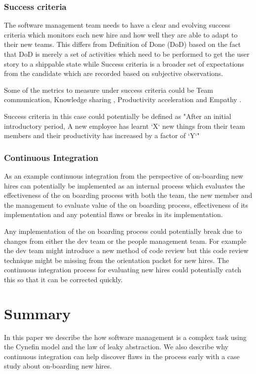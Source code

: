 \documentclass[12pt,conference]{IEEEtran}
\begin{document}
\subsubsection*{Success criteria} The software management team needs to have a clear and evolving success criteria which monitors each new hire and how well they are able to adapt to their new teams. This differs from Definition of Done (DoD) based on the fact that DoD is merely a set of activities which need to be performed to get the user story to a shippable state while Success criteria is a broader set of expectations from the candidate which are recorded based on subjective observations. 

Some of the metrics to measure under success criteria could be Team communication, Knowledge sharing \cite{cabrera_fostering_2005}, Productivity acceleration \cite{grote_making_2011} and Empathy \cite{seppala_hard_2014}.

Success criteria in this case could potentially be defined as "After an initial introductory period, A new employee has learnt `X` new things from their team members and their productivity has increased by a factor of `Y`"

\subsubsection*{Continuous Integration}
As an example continuous integration from the perspective of on-boarding new hires can potentially be implemented as an internal process which evaluates the effectiveness of the on boarding process with both the team, the new member and the management to evaluate value of the on boarding process, effectiveness of its implementation and any potential flaws or breaks in its implementation. 

Any implementation of the on boarding process could potentially break due to changes from either the dev team or the people management team. For example the dev team might introduce a new method of code review but this code review technique might be missing from the orientation packet for new hires. The continuous integration process for evaluating new hires could potentially catch this so that it can be corrected quickly.


\section*{Summary}

In this paper we describe the how software management is a complex task using the Cynefin model and the law of leaky abstraction. We also describe why continuous integration can help discover flaws in the process early with a case study about on-boarding new hires.



\end{document}
